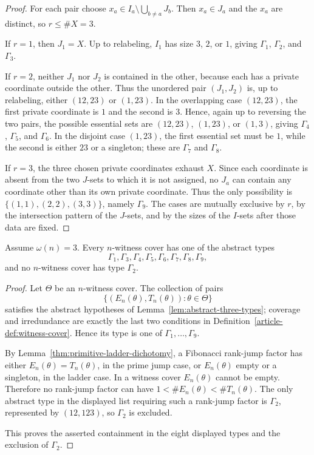 \begin{proof}
For each pair choose
$x_a\in I_a\setminus\bigcup_{b\ne a}J_b$. Then $x_a\in J_a$ and the
$x_a$ are distinct, so $r\le\#X=3$.

If $r=1$, then $J_1=X$. Up to relabeling, $I_1$ has size $3$, $2$, or $1$,
giving $\Gamma_1$, $\Gamma_2$, and $\Gamma_3$.

If $r=2$, neither $J_1$ nor $J_2$ is contained in the other, because each
has a private coordinate outside the other. Thus the unordered pair
$(J_1,J_2)$ is, up to relabeling, either $(12,23)$ or $(1,23)$. In the
overlapping case $(12,23)$, the first private coordinate is $1$ and the
second is $3$. Hence, again up to reversing the two pairs, the possible
essential sets are $(12,23)$, $(1,23)$, or $(1,3)$, giving
$\Gamma_4$, $\Gamma_5$, and $\Gamma_6$. In the disjoint case $(1,23)$, the
first essential set must be $1$, while the second is either $23$ or a
singleton; these are $\Gamma_7$ and $\Gamma_8$.

If $r=3$, the three chosen private coordinates exhaust $X$. Since each
coordinate is absent from the two $J$-sets to which it is not assigned, no
$J_a$ can contain any coordinate other than its own private coordinate.
Thus the only possibility is
$\{(1,1),(2,2),(3,3)\}$, namely $\Gamma_9$.
The cases are mutually exclusive by $r$, by the intersection pattern of the
$J$-sets, and by the sizes of the $I$-sets after those data are fixed.
\end{proof}

\begin{lemma}\label{lem:fibonacci-three-coordinate-types}
Assume $\omega(n)=3$. Every $n$-witness cover has one of the abstract types
\[
\Gamma_1,\Gamma_3,\Gamma_4,\Gamma_5,\Gamma_6,\Gamma_7,\Gamma_8,\Gamma_9,
\]
and no $n$-witness cover has type $\Gamma_2$.
\end{lemma}

\begin{proof}
Let $\Theta$ be an $n$-witness cover. The collection of pairs
\[
\{(E_n(\theta),T_n(\theta)):\theta\in\Theta\}
\]
satisfies the abstract hypotheses of
Lemma~\ref{lem:abstract-three-types}; coverage and irredundance are exactly
the last two conditions in Definition~\ref{article-def:witness-cover}. Hence its
type is one of $\Gamma_1,\ldots,\Gamma_9$.

By Lemma~\ref{thm:primitive-ladder-dichotomy}, a Fibonacci rank-jump factor has either
$E_n(\theta)=T_n(\theta)$, in the prime jump case, or
$E_n(\theta)$ empty or a singleton, in the ladder case. In a witness cover
$E_n(\theta)$ cannot be empty. Therefore no rank-jump factor can have
$1<\#E_n(\theta)<\#T_n(\theta)$. The only abstract type in the displayed
list requiring such a rank-jump factor is $\Gamma_2$, represented by $(12,123)$, so
$\Gamma_2$ is excluded.

This proves the asserted containment in the eight displayed types and the
exclusion of $\Gamma_2$.
\end{proof}

